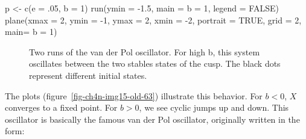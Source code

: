 \documentclass[
  a4paper,
  DIV=11,
  numbers=noendperiod,
  oneside]{scrreprt}
\newenvironment{Shaded}{}{}
\newcommand{\AttributeTok}[1]{\textcolor[rgb]{0.84,0.23,0.29}{#1}}
\newcommand{\ConstantTok}[1]{\textcolor[rgb]{0.00,0.36,0.77}{#1}}
\newcommand{\DecValTok}[1]{\textcolor[rgb]{0.00,0.36,0.77}{#1}}
\newcommand{\FloatTok}[1]{\textcolor[rgb]{0.00,0.36,0.77}{#1}}
\newcommand{\FunctionTok}[1]{\textcolor[rgb]{0.44,0.26,0.76}{#1}}
\newcommand{\NormalTok}[1]{\textcolor[rgb]{0.14,0.16,0.18}{#1}}
\newcommand{\OtherTok}[1]{\textcolor[rgb]{0.44,0.26,0.76}{#1}}
\newcommand{\SpecialCharTok}[1]{\textcolor[rgb]{0.00,0.36,0.77}{#1}}
\newcommand{\StringTok}[1]{\textcolor[rgb]{0.01,0.18,0.38}{#1}}
\begin{document}
\begin{Shaded}
\begin{Highlighting}[]
\NormalTok{p }\OtherTok{\textless{}{-}} \FunctionTok{c}\NormalTok{(}\AttributeTok{e =}\NormalTok{ .}\DecValTok{05}\NormalTok{, }\AttributeTok{b =} \DecValTok{1}\NormalTok{)}
\FunctionTok{run}\NormalTok{(}\AttributeTok{ymin =} \SpecialCharTok{{-}}\FloatTok{1.5}\NormalTok{, }\AttributeTok{main =} \StringTok{\textquotesingle{}b = 1\textquotesingle{}}\NormalTok{, }\AttributeTok{legend =} \ConstantTok{FALSE}\NormalTok{)}
\FunctionTok{plane}\NormalTok{(}\AttributeTok{xmax =} \DecValTok{2}\NormalTok{, }\AttributeTok{ymin =} \SpecialCharTok{{-}}\DecValTok{1}\NormalTok{, }\AttributeTok{ymax =} \DecValTok{2}\NormalTok{, }\AttributeTok{xmin =} \SpecialCharTok{{-}}\DecValTok{2}\NormalTok{,}
      \AttributeTok{portrait =} \ConstantTok{TRUE}\NormalTok{, }\AttributeTok{grid =} \DecValTok{2}\NormalTok{, }\AttributeTok{main=} \StringTok{\textquotesingle{}b = 1\textquotesingle{}}\NormalTok{)}
\end{Highlighting}
\end{Shaded}

\begin{figure}


\caption{\label{fig-ch4n-img14-old-62}Two runs of the van der Pol
oscillator. For high b, this system oscillates between the two stables
states of the cusp. The black dots represent different initial states.}

\end{figure}%

The plots (figure~\ref{fig-ch4n-img15-old-63}) illustrate this behavior.
For \(b < 0\), \(X\) converges to a fixed point. For \(b > 0\), we see
cyclic jumps up and down. This oscillator is basically the famous van
der Pol oscillator, originally written in the form:
\end{document}
